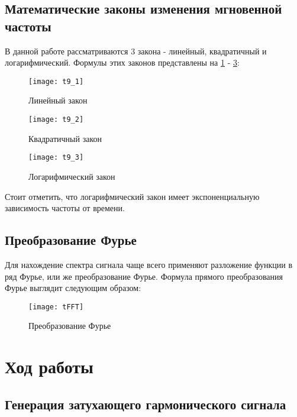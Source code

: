 \subsection{Математические законы изменения мгновенной частоты}
В данной работе рассматриваются 3 закона - линейный, квадратичный и логарифмический. Формулы этих законов представлены на \ref{pic:t9_1} - \ref{pic:t9_3}:
\begin{figure}[H]
	\begin{center}
		\texttt{[image: t9\_1]}
		\caption{Линейный закон} 
		\label{pic:t9_1} %
	\end{center}
\end{figure}
\begin{figure}[H]
	\begin{center}
		\texttt{[image: t9\_2]}
		\caption{Квадратичный закон} 
		\label{pic:t9_2} %
	\end{center}
\end{figure}
\begin{figure}[H]
	\begin{center}
		\texttt{[image: t9\_3]}
		\caption{Логарифмический закон} 
		\label{pic:t9_3} %
	\end{center}
\end{figure}
Стоит отметить, что логарифмический закон имеет экспоненциальную зависимость частоты от времени.

\subsection{Преобразование Фурье}
Для нахождение спектра сигнала чаще всего применяют разложение функции в ряд Фурье, или же преобразование Фурье.
Формула прямого преобразования Фурье выглядит следующим образом:
\begin{figure}[H]
	\begin{center}
		\texttt{[image: tFFT]}
		\caption{Преобразование Фурье} 
		\label{pic:tFFT} %
	\end{center}
\end{figure}



\section{Ход работы}

\subsection{Генерация затухающего гармонического сигнала}

